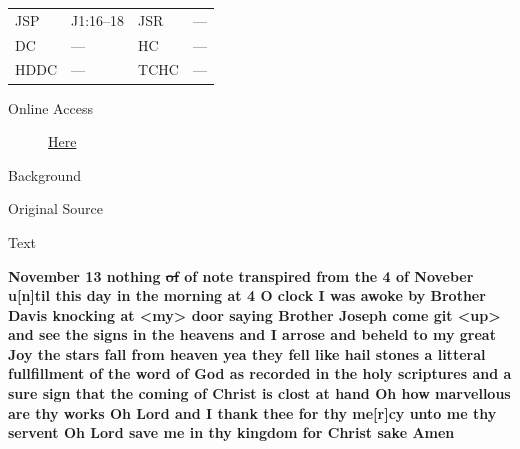 				\begin{tabular}{p{0.5in}p{1in}p{0.5in}p{1in}}
				JSP	 	& J1:16--18	& JSR 		& --- \\
				DC	 	& ---	& HC 		& --- \\
				HDDC 	& ---	& TCHC 		& --- \\
				\end{tabular}
			
			\begin{description}
				\item[Online Access] \href{https://www.josephsmithpapers.org/paper-summary/journal-1832-1834/19}{Here}
			\end{description}
			
			\begin{description}
				\item[Background]
			\end{description}
			
			
			\begin{description}
				\item[Original Source]
			\end{description}
			
			
			\begin{description}
				\item[Text]
			\end{description}
			
				\textbf{November 13 nothing \sout{of} of note transpired from the 4 of Noveber u[n]til this day in the morning at 4 O clock I was awoke by Brother Davis knocking at <my> door saying Brother Joseph come git <up> and see the signs in the heavens and I arrose and beheld to my great Joy the stars fall from heaven yea they fell like hail stones a litteral fullfillment of the word of God as recorded in the holy scriptures and a sure sign that the coming of Christ is clost at hand Oh how marvellous are thy works Oh Lord and I thank thee for thy me[r]cy unto me thy servent Oh Lord save me in thy kingdom for Christ sake Amen}
				

